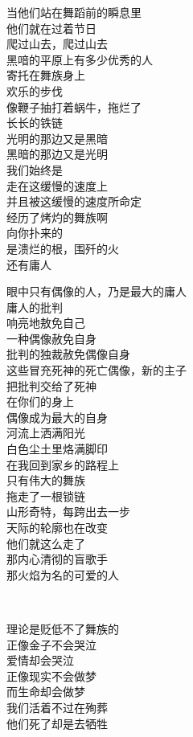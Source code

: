 \documentclass{article}
\begin{document}
当他们站在舞蹈前的瞬息里
\\
他们就在过着节日 \\ 


爬过山去，爬过山去\\
黑喑的平原上有多少优秀的人\\
寄托在舞族身上\\
欢乐的步伐\\
像鞭子抽打着蜗牛，拖烂了\\
长长的铁链\\
光明的那边又是黑暗\\
黑暗的那边又是光明\\
我们始终是\\
走在这缓慢的速度上
\\
并且被这缓慢的速度所命定 \\ 


经历了烤灼的舞族啊\\
向你扑来的\\
是溃烂的根，围歼的火\\
还有庸人\\
\newpage

眼中只有偶像的人，乃是最大的庸人\\
庸人的批判\\
响亮地敖免自己\\
一种偶像赦免自身\\
批判的独裁赦免偶像自身\\
这些冒充死神的死亡偶像，新的主子\\
把批判交给了死神\\
在你们的身上
\\
偶像成为最大的自身 \\ 


河流上洒满阳光\\
白色尘土里烙满脚印\\
在我回到家乡的路程上\\
只有伟大的舞族\\
拖走了一根锁链\\
山形奇特，每跨出去一步\\
天际的轮廓也在改变\\
他们就这么走了\\
那内心清彻的盲歌手
\\
那火焰为名的可爱的人 \par \\
\newpage

理论是贬低不了舞族的\\
正像金子不会哭泣\\
爱情却会哭泣\\
正像现实不会做梦\\
而生命却会做梦\\
我们活着不过在殉葬
\\
他们死了却是去牺牲 \\ 
\end{document}
